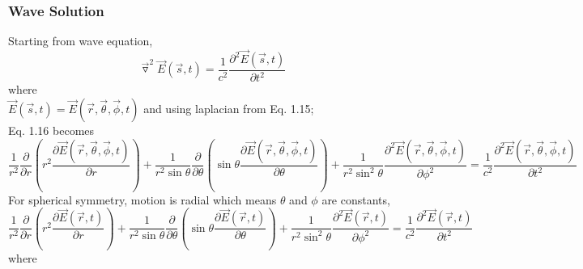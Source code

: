\documentclass[a4paper, twoside] {thesis}
\begin{document}
\subsubsection{Wave Solution}
Starting from wave equation,\\
\begin{equation}
\vec{\triangledown}^2\vec{E}(\vec{s},t) =  \frac{1}{c^2}\frac{\partial^2\vec{E}(\vec{s},t)}{\partial t^2}
\end{equation}
where\\
$\vec{E}(\vec{s},t) = \vec{E}(\vec{r},\vec{\theta},\vec{\phi},t)$
and using laplacian from Eq. 1.15;\\
Eq. 1.16 becomes\\
\begin{equation}
\frac{1}{r^2}\frac{\partial}{\partial r}(r^2\frac{\partial\vec{E}(\vec{r},\vec{\theta},\vec{\phi},t) }{\partial r})+\frac{1}{r^2\sin\theta}\frac{\partial}{\partial\theta}(\sin\theta\frac{\partial \vec{E}(\vec{r},\vec{\theta},\vec{\phi},t)}{\partial \theta})+\frac{1}{r^2\sin^2\theta}\frac{\partial^2\vec{E}(\vec{r},\vec{\theta},\vec{\phi},t)}{\partial \phi^2} = \frac{1}{c^2}\frac{\partial^2\vec{E}(\vec{r},\vec{\theta},\vec{\phi},t)}{\partial t^2}
\end{equation}
For spherical symmetry, motion is radial which means $\theta$ and $\phi$ are constants,\\
\begin{equation}
\frac{1}{r^2}\frac{\partial}{\partial r}(r^2\frac{\partial\vec{E}(\vec{r},t) }{\partial r})+\frac{1}{r^2\sin\theta}\frac{\partial}{\partial\theta}(\sin\theta\frac{\partial \vec{E}(\vec{r},t)}{\partial \theta})+\frac{1}{r^2\sin^2\theta}\frac{\partial^2\vec{E}(\vec{r},t)}{\partial \phi^2} = \frac{1}{c^2}\frac{\partial^2\vec{E}(\vec{r},t)}{\partial t^2}
\end{equation}
where\\
\end{document}
